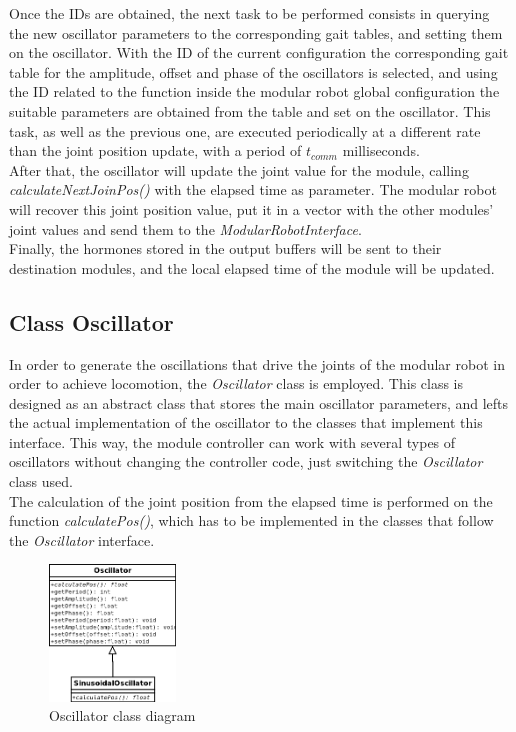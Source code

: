 Once the IDs are obtained, the next task to be performed consists in querying the new oscillator parameters to the corresponding gait tables, and setting them on the oscillator. With the ID of the current configuration the corresponding gait table for the amplitude, offset and phase of the oscillators is selected, and using the ID related to the function inside the modular robot global configuration the suitable parameters are obtained from the table and set on the oscillator. This task, as well as the previous one, are executed periodically at a different rate than the joint position update, with a period of $t_{comm}$ milliseconds.\\

After that, the oscillator will update the joint value for the module, calling \emph{calculateNextJoinPos()} with the elapsed time as parameter. The modular robot will recover this joint position value, put it in a vector with the other modules' joint values and send them to the \emph{ModularRobotInterface}.\\

Finally, the hormones stored in the output buffers will be sent to their destination modules, and the local elapsed time of the module will be updated.\\


\subsection{Class Oscillator}
\label{software_class_oscillator}

In order to generate the oscillations that drive the joints of the modular robot in order to achieve locomotion, the \emph{Oscillator} class is employed. This class is designed as an abstract class that stores the main oscillator parameters, and lefts the actual implementation of the oscillator to the classes that implement this interface. This way, the module controller can work with several types of oscillators without changing the controller code, just switching the \emph{Oscillator} class used.\\

The calculation of the joint position from the elapsed time is performed on the function \emph{calculatePos()}, which has to be implemented in the classes that follow the \emph{Oscillator} interface.\\
\begin{figure}[h]
		\centering
        \includegraphics[width=0.3\textwidth]{images/Class_diagram_Oscillator.png}
        \caption{Oscillator class diagram}\label{fig:software_class_oscillator_class}
\end{figure}


